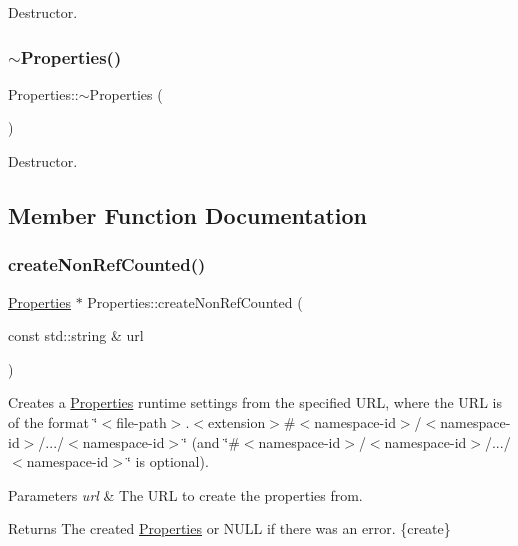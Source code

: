Destructor. \mbox{\label{classProperties_a9a4367c64d90a962fc260128587670dd}} 
\subsubsection{\texorpdfstring{$\sim$\+Properties()}{~Properties()}\hspace{0.1cm}{\footnotesize\ttfamily [2/2]}}
{\footnotesize\ttfamily Properties\+::$\sim$\+Properties (\begin{DoxyParamCaption}{ }\end{DoxyParamCaption})}

Destructor. 

\subsection{Member Function Documentation}
\mbox{\label{classProperties_a582e172b9f288408b79f768fddc2e77f}} 
\subsubsection{\texorpdfstring{create\+Non\+Ref\+Counted()}{createNonRefCounted()}\hspace{0.1cm}{\footnotesize\ttfamily [1/2]}}
{\footnotesize\ttfamily \hyperlink{classProperties}{Properties} $\ast$ Properties\+::create\+Non\+Ref\+Counted (\begin{DoxyParamCaption}\item[{const std\+::string \&}]{url }\end{DoxyParamCaption})\hspace{0.3cm}{\ttfamily [static]}}

Creates a \hyperlink{classProperties}{Properties} runtime settings from the specified U\+RL, where the U\+RL is of the format \char`\"{}$<$file-\/path$>$.$<$extension$>$\#$<$namespace-\/id$>$/$<$namespace-\/id$>$/.../$<$namespace-\/id$>$\char`\"{} (and \char`\"{}\#$<$namespace-\/id$>$/$<$namespace-\/id$>$/.../$<$namespace-\/id$>$\char`\"{} is optional).


\begin{DoxyParams}{Parameters}
{\em url} & The U\+RL to create the properties from.\\
\hline
\end{DoxyParams}
\begin{DoxyReturn}{Returns}
The created \hyperlink{classProperties}{Properties} or N\+U\+LL if there was an error. \{create\} 
\end{DoxyReturn}
\mbox{\label{classProperties_ab9301685c24feb40541f48c1f9da6b56}} 
